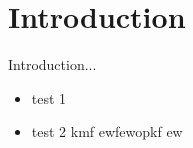 \chapter{Introduction}
\label{introduction}
Introduction...
\begin{itemize}
	\item test 1
	\item test 2 kmf ewfewopkf ew
	
\end{itemize}